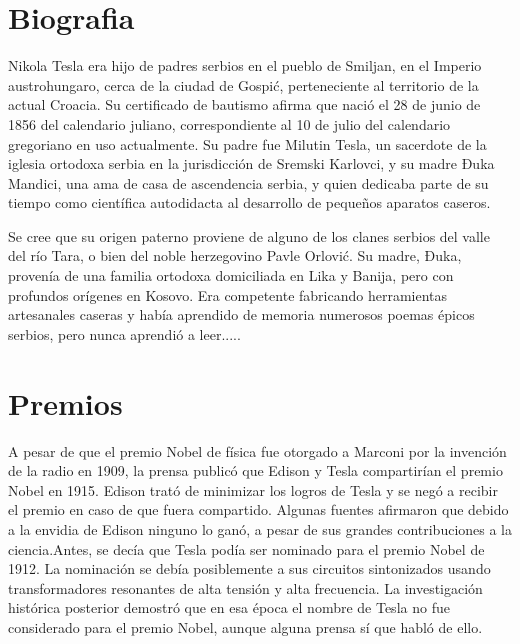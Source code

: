 \documentclass[a4paper,openright,12pt]{report}
\begin{document}
\tableofcontents
\begin{large}
\chapter{Biografia}
\begin{flushleft}
Nikola Tesla era hijo de padres serbios en el pueblo de Smiljan, en el Imperio austrohungaro, cerca de la ciudad de Gospić, perteneciente al territorio de la actual Croacia. Su certificado de bautismo afirma que nació el 28 de junio de 1856 del calendario juliano, correspondiente al 10 de julio del calendario gregoriano en uso actualmente. Su padre fue Milutin Tesla, un sacerdote de la iglesia ortodoxa serbia en la jurisdicción de Sremski Karlovci, y su madre Đuka Mandici, una ama de casa de ascendencia serbia,​ y quien dedicaba parte de su tiempo como científica autodidacta al desarrollo de pequeños aparatos caseros.

Se cree que su origen paterno proviene de alguno de los clanes serbios del valle del río Tara, o bien del noble herzegovino Pavle Orlović.​ Su madre, Đuka, provenía de una familia ortodoxa domiciliada en Lika y Banija, pero con profundos orígenes en Kosovo.​ Era competente fabricando herramientas artesanales caseras y había aprendido de memoria numerosos poemas épicos serbios, pero nunca aprendió a leer.....\\
\end{flushleft}


\chapter{Premios}\label{cap.nudo}
\begin{flushleft}
A pesar de que el premio Nobel de física fue otorgado a Marconi por la invención de la radio en 1909, la prensa publicó que Edison y Tesla compartirían el premio Nobel en 1915. Edison trató de minimizar los logros de Tesla y se negó a recibir el premio en caso de que fuera compartido. Algunas fuentes afirmaron que debido a la envidia de Edison ninguno lo ganó, a pesar de sus grandes contribuciones a la ciencia.​ Antes, se decía que Tesla podía ser nominado para el premio Nobel de 1912. La nominación se debía posiblemente a sus circuitos sintonizados usando transformadores resonantes de alta tensión y alta frecuencia. La investigación histórica posterior demostró que en esa época el nombre de Tesla no fue considerado para el premio Nobel, aunque alguna prensa sí que habló de ello.


\end{flushleft}
\end{large}
\end{document}
